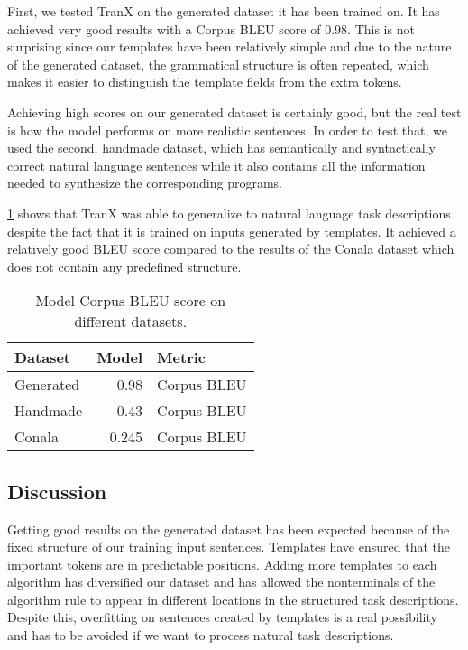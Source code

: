First, we tested TranX on the generated dataset it has been trained on. It has
achieved very good results with a Corpus BLEU score of 0.98. This is not
surprising since our templates have been relatively simple and due to the nature
of the generated dataset, the grammatical structure is often repeated, which
makes it easier to distinguish the template fields from the extra tokens.

Achieving high scores on our generated dataset is certainly good, but the real
test is how the model performs on more realistic sentences. In order to test
that, we used the second, handmade dataset, which has semantically and
syntactically correct natural language sentences while it also contains all the
information needed to synthesize the corresponding programs.

\cref{tab:result} shows that TranX was able to generalize to natural language
task descriptions despite the fact that it is trained on inputs generated by
templates. It achieved a relatively good BLEU score compared to the results of
the Conala dataset which does not contain any predefined structure.

\begin{table}[h]
  \normalsize \centering
  \begin{tabular}{lrl}
    \toprule
    Dataset  & Model & Metric \\
    \midrule
    Generated &  0.98  & Corpus BLEU \\
    Handmade  &  0.43  & Corpus BLEU \\
    Conala    &  0.245 & Corpus BLEU \\
    \bottomrule
  \end{tabular}
  \vspace{0.1cm}
  \caption{Model Corpus BLEU score on different datasets.}
  \label{tab:result}
\end{table}

\subsection{Discussion}

Getting good results on the generated dataset has been expected because of the
fixed structure of our training input sentences. Templates have ensured that the
important tokens are in predictable positions. Adding more templates to each
algorithm has diversified our dataset and has allowed the nonterminals of the
algorithm rule to appear in different locations in the structured task
descriptions. Despite this, overfitting on sentences created by templates is a
real possibility and has to be avoided if we want to process natural task
descriptions.

